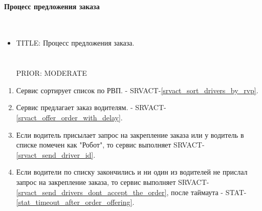     \paragraph{Процесс предложения заказа} \mbox{} \\

      \begin{itemize}

        \item {
          TITLE: Процесс предложения заказа.\\
          \\
          \\
          PRIOR: MODERATE\\
        }

      \end{itemize}

      \begin{alg} \label{alg_order_offering} \mbox{}

        \begin{enumerate}

          \item Сервис сортирует список по РВП. - SRVACT-\ref{srvact_sort_drivers_by_rvp}.

          \item Сервис предлагает заказ водителям. - SRVACT-\ref{srvact_offer_order_with_delay}.
          
          \item Если водитель присылает запрос на закрепление заказа или у водитель в списке помечен как "Робот", то сервис выполняет SRVACT-\ref{srvact_send_driver_id}. 

          \item Если водители по списку закончились и ни один из водителей не прислал запрос на закрепление заказа, то сервис выполняет SRVACT-\ref{srvact_send_drivers_dont_accept_the_order}, после таймаута - STAT-\ref{stat_timeout_after_order_offering}.

        \end{enumerate}

      \end{alg}

